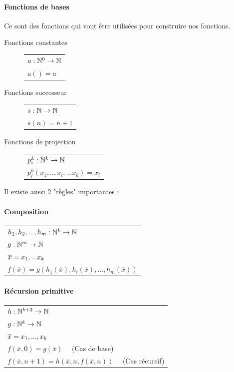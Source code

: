 \paragraph{Fonctions de bases} Ce sont des fonctions qui vont être utilisées 
pour construire nos fonctions.

\begin{description}
	\item[Fonctions constantes] 
		\begin{tabular}{|l|}
			\hline
			$a: \mathbb{N}^0 \rightarrow \mathbb{N}$\\
			$a() = a$\\
			\hline
		\end{tabular}
	\item[Fonctions successeur] 
		\begin{tabular}{|l|}
			\hline
			$s: \mathbb{N} \rightarrow \mathbb{N}$\\
			$s(n) = n + 1$\\
			\hline
		\end{tabular}
	\item[Fonctions de projection] 
		\begin{tabular}{|l|}
			\hline
			$p^k_i: \mathbb{N}^k \rightarrow \mathbb{N}$\\
			$p^k_i(x_1,..,x_i,...x_k) = x_i$\\
			\hline
		\end{tabular}
\end{description}

Il existe aussi 2 "règles" importantes :
\paragraph{Composition}
\begin{tabular}{|l|}
	\hline
	$h_1, h_2,...,h_m: \mathbb{N}^k \rightarrow \mathbb{N}$\\
	$g: \mathbb{N}^m \rightarrow \mathbb{N}$\\
	$\overline{x} =x_1,...x_k$ \\
	$f(\overline{x}) = 
	g(h_1(\overline{x}),h_i(\overline{x}),...,h_m(\overline{x}))$\\
	\hline
\end{tabular}

\paragraph{Récursion primitive}
\begin{tabular}{|l|}
	\hline
	$h: \mathbb{N}^{k+2} \rightarrow \mathbb{N}$\\
	$g: \mathbb{N}^k \rightarrow \mathbb{N}$\\
	$\overline{x} =x_1,...,x_k$ \\
	$f(\overline{x}, 0) = g(\overline{x}) \quad$ (Cas de base)\\
	$f(\overline{x}, n+1) = 
	h(\overline{x},n, f(\overline{x}, n))\quad$ (Cas récursif)\\
	\hline
\end{tabular}

